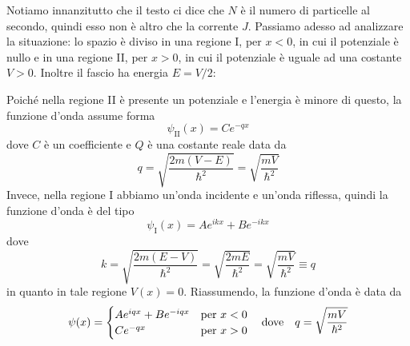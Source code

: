 \begin{soluzione}
   Notiamo innanzitutto che il testo ci dice che $N$ è il numero di particelle al secondo, quindi esso non è altro che la corrente $J$. Passiamo adesso ad analizzare la situazione: lo spazio è diviso in una regione I, per $x<0$, in cui il potenziale è nullo e in una regione II, per $x>0$, in cui il potenziale è uguale ad una costante $V>0$. Inoltre il fascio ha energia $E=V/2$:
   \begin{figure}[H]
      \centering
   \end{figure}
   Poiché nella regione II è presente un potenziale e l'energia è minore di questo, la funzione d'onda assume forma
   \begin{equation*}
      \psi_{\text{II}}(x)=Ce^{-qx}
   \end{equation*}
   dove $C$ è un coefficiente e $Q$ è una costante reale data da
   \begin{equation*}
      q
      =\sqrt{\frac{2m(V-E)}{\hbar^2}}
      =\sqrt{\frac{mV}{\hbar^2}}
   \end{equation*}
   Invece, nella regione I abbiamo un'onda incidente e un'onda riflessa, quindi la funzione d'onda è del tipo
   \begin{equation*}
      \psi_{\text{I}}(x)=Ae^{ikx} + Be^{-ikx}
   \end{equation*}
   dove
   \begin{equation*}
      k
      =\sqrt{\frac{2m(E-V)}{\hbar^2}}
      =\sqrt{\frac{2mE}{\hbar^2}}
      =\sqrt{\frac{mV}{\hbar^2}}
      \equiv q
   \end{equation*}
   in quanto in tale regione $V(x)=0$.
   Riassumendo, la funzione d'onda è data da
   \begin{equation*}
      \psi(x)=
      \begin{cases}
         A e^{iqx} + Be^{-iqx} & \text{per } x<0\\
         Ce^{-qx} & \text{per } x>0
      \end{cases}
      \qq{dove}
      q
      =\sqrt{\frac{mV}{\hbar^2}}

\end{equation*}
\end{soluzione}
